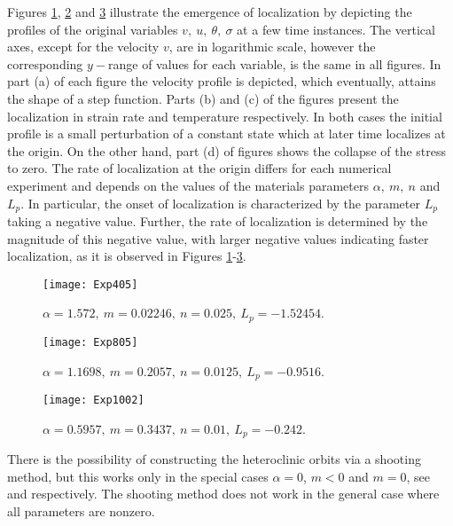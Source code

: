 \documentclass[11pt]{article}
\theoremstyle{remark}
\begin{document}
Figures \ref{fig_n40}, \ref{fig_n80} and \ref{fig_n100} illustrate the emergence of
localization by depicting the profiles of the original variables $v,\ u, \ \theta, \ \sigma$ at a few time instances. The vertical axes, except for the velocity $v$, are in logarithmic scale, however the corresponding $y-$range of values for each variable, is the same in all figures.   In part (a) of each figure the velocity profile is depicted,  which eventually, attains the shape of a step function. Parts
(b) and (c) of the figures present the localization in strain rate and temperature respectively. In both cases the initial profile is a small perturbation of a constant state which at later time localizes at the origin. On the other hand, part (d) of figures
shows the collapse of the stress to zero.
%
The rate of localization at the origin  differs for each numerical experiment and depends on the values of the materials parameters $\alpha, \ m, \ n$ and $L_p$.
In particular, the onset of localization is characterized by the parameter $L_p$ taking a negative value. Further,  the rate of localization is determined by the magnitude of this negative value, with larger negative values indicating faster localization, as it is observed in Figures \ref{fig_n40}-\ref{fig_n100}.

\begin{figure}
\centering\texttt{[image: Exp405]}
\caption{$\alpha=1.572, \ m=0.02246, \ n=0.025, \ L_p = -1.52454$.}
\label{fig_n40}
\end{figure}

\begin{figure}
\texttt{[image: Exp805]}
\centering\caption{$\alpha=1.1698, \ m=0.2057, \ n=0.0125, \ L_p = -0.9516$.}
\label{fig_n80}
\end{figure}

\begin{figure}
\texttt{[image: Exp1002]}
\centering\caption{$\alpha=0.5957, \ m=0.3437, \ n=0.01, \ L_p = -0.242$.}
\label{fig_n100}
\end{figure}

There is the possibility of constructing the heteroclinic orbits via a shooting method, but this works only in the special cases $\alpha = 0$, $m <0$ and  $m=0$, see \cite{KLT_2016}
and \cite{KLT_HYP2016} respectively. The shooting method does not work in the general case where all parameters are nonzero.



\appendix
\end{document}

